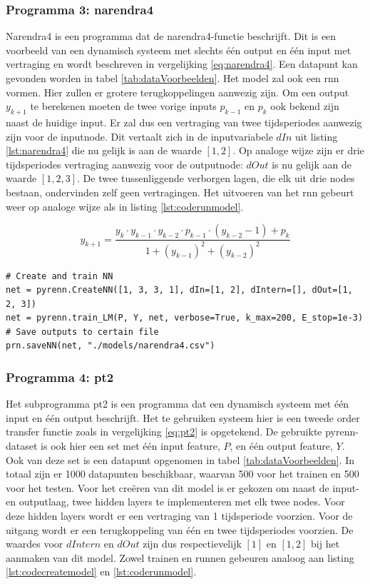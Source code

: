 		\subsubsection{Programma 3: narendra4}
		Narendra4 is een programma dat de narendra4-functie\cite{narendra4} beschrijft. Dit is een voorbeeld van een dynamisch systeem met slechts \'e\'en output en \'e\'en input met vertraging en wordt beschreven in vergelijking \ref{eq:narendra4}. Een datapunt kan gevonden worden in tabel \ref{tab:dataVoorbeelden}. Het model zal ook een \gls{rnn} vormen. Hier zullen er grotere terugkoppelingen aanwezig zijn. Om een output $y_{k+1}$ te berekenen moeten de twee vorige inputs $p_{k-1}$ en $p_{k}$ ook bekend zijn naast de huidige input. Er zal dus een vertraging van twee tijdsperiodes aanwezig zijn voor de inputnode. Dit vertaalt zich in de inputvariabele $dIn$ uit listing \ref{lst:narendra4} die nu gelijk is aan de waarde $[1,2]$. Op analoge wijze zijn er drie tijdsperiodes vertraging aanwezig voor de outputnode: $dOut$ is nu gelijk aan de waarde $[1,2,3]$. De twee tussenliggende verborgen lagen, die elk uit drie nodes bestaan, ondervinden zelf geen vertragingen. Het uitvoeren van het \gls{rnn} gebeurt weer op analoge wijze als in listing \ref{lst:coderunmodel}.
		
		\begin{equation}\label{eq:narendra4}
			y_{k+1} =\frac{ y_k \cdot y_{k-1} \cdot y_{k-2}\cdot p_{k-1}\cdot(y_{k-2}-1	)+ p_k} {1+(y_{k-1})^2+(y_{k-2})^2}	
		\end{equation}
		
		\begin{lstlisting}[caption={Cre\"eren en trainen van pyrenn-model voor narendra4.}, captionpos=b,label={lst:narendra4}]
# Create and train NN
net = pyrenn.CreateNN([1, 3, 3, 1], dIn=[1, 2], dIntern=[], dOut=[1, 2, 3])
net = pyrenn.train_LM(P, Y, net, verbose=True, k_max=200, E_stop=1e-3)
# Save outputs to certain file
prn.saveNN(net, "./models/narendra4.csv")
		\end{lstlisting}
		
		\subsubsection{Programma 4: pt2}
		Het subprogramma pt2 is een programma dat een dynamisch systeem met \'e\'en input en \'e\'en output beschrijft. Het te gebruiken systeem hier is een tweede order transfer functie zoals in vergelijking \ref{eq:pt2} is opgetekend. De gebruikte pyrenn-dataset is ook hier een set met \'e\'en input feature, $P$, en \'e\'en output feature, $Y$. Ook van deze set is een datapunt opgenomen in tabel \ref{tab:dataVoorbeelden}. In totaal zijn er 1000 datapunten beschikbaar, waarvan 500 voor het trainen en 500 voor het testen. Voor het cre\"eren van dit model is er gekozen om naast de input- en outputlaag, twee hidden layers te implementeren met elk twee nodes. Voor deze hidden layers wordt er een vertraging van 1 tijdsperiode voorzien. Voor de uitgang wordt er een terugkoppeling van \'e\'en en twee tijdsperiodes voorzien. De waardes voor $dIntern$ en $dOut$ zijn dus respectievelijk $[1]$ en $[1,2]$ bij het aanmaken van dit model. Zowel trainen en runnen gebeuren analoog aan listing  \ref{lst:codecreatemodel} en \ref{lst:coderunmodel}.
		
